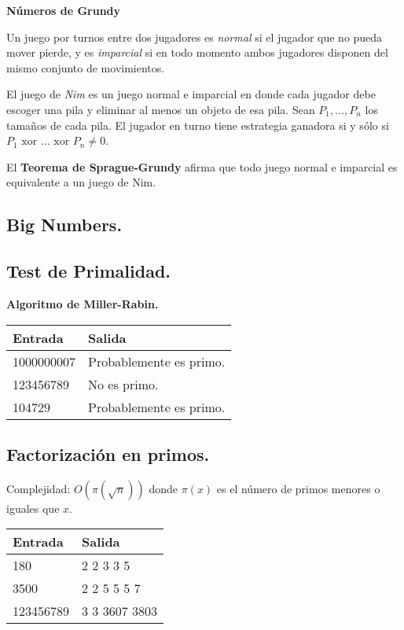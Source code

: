 \documentclass[10pt, letterpaper, twoside]{article}
\begin{document}
\textbf{Números de Grundy}

Un juego por turnos entre dos jugadores es \textit{normal} si el jugador que no pueda mover pierde, y es \textit{imparcial} si en todo momento ambos jugadores disponen del mismo conjunto de movimientos.

El juego de \textit{Nim} es un juego normal e imparcial en donde cada jugador debe escoger una pila y eliminar al menos un objeto de esa pila. Sean $P_1, \ldots, P_n$ los tamaños de cada pila. El jugador en turno tiene estrategia ganadora si y sólo si $P_1 \text{ xor } \ldots \text{ xor } P_n \neq 0$.

El \textbf{Teorema de Sprague-Grundy} afirma que todo juego normal e imparcial es equivalente a un juego de Nim.

\subsection{Big Numbers.}



\subsection{Test de Primalidad.}

\textbf{Algoritmo de Miller-Rabin.}

 

\begin{tabular}{|p{7cm}|p{7cm}|}
\hline
\textbf{Entrada} & \textbf{Salida}\\ \hline
1000000007 & Probablemente es primo.\\
123456789  & No es primo.\\
104729     & Probablemente es primo.\\ \hline
\end{tabular}\bigskip

\subsection{Factorización en primos.}

Complejidad: $O\left(\pi\left(\sqrt{n}\right)\right)$ donde $\pi(x)$ es el número de primos menores o iguales que $x$.



\begin{tabular}{|p{7cm}|p{7cm}|}
\hline
\textbf{Entrada} & \textbf{Salida}\\ \hline
180       & 2 2 3 3 5\\
3500      & 2 2 5 5 5 7\\ 
123456789 & 3 3 3607 3803\\ \hline
\end{tabular}\bigskip
\end{document}
